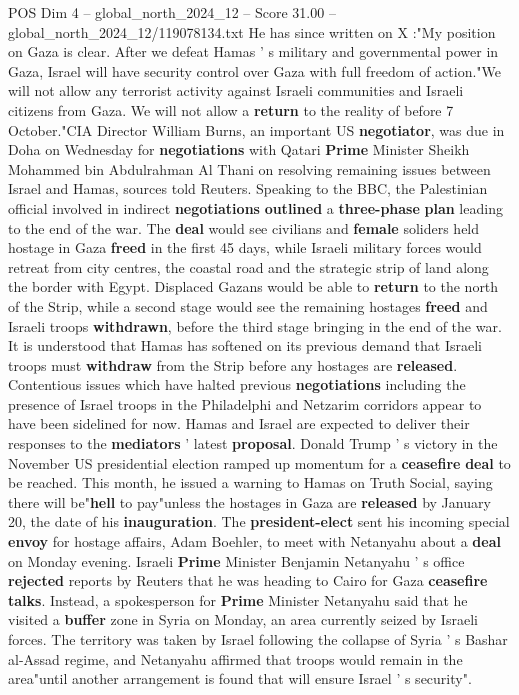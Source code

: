 \begin{textsample}{POS Dim 4 – global\_north\_2024\_12 – Score 31.00 – global\_north\_2024\_12/119078134.txt}
He has since written on X :"My position on Gaza is clear.
After we defeat Hamas ' s military and governmental power in Gaza, Israel will have security control over Gaza with full freedom of action."We will not allow any terrorist activity against Israeli communities and Israeli citizens from Gaza.
We will not allow a \textbf{return} to the reality of before 7 October."CIA Director William Burns, an important US \textbf{negotiator}, was due in Doha on Wednesday for \textbf{negotiations} with Qatari \textbf{Prime} Minister Sheikh Mohammed bin Abdulrahman Al Thani on resolving remaining issues between Israel and Hamas, sources told Reuters.
Speaking to the BBC, the Palestinian official involved in indirect \textbf{negotiations} \textbf{outlined} a \textbf{three-phase} \textbf{plan} leading to the end of the war.
The \textbf{deal} would see civilians and \textbf{female} soliders held hostage in Gaza \textbf{freed} in the first 45 days, while Israeli military forces would retreat from city centres, the coastal road and the strategic strip of land along the border with Egypt.
Displaced Gazans would be able to \textbf{return} to the north of the Strip, while a second stage would see the remaining hostages \textbf{freed} and Israeli troops \textbf{withdrawn}, before the third stage bringing in the end of the war.
It is understood that Hamas has softened on its previous demand that Israeli troops must \textbf{withdraw} from the Strip before any hostages are \textbf{released}.
Contentious issues which have halted previous \textbf{negotiations} including the presence of Israel troops in the Philadelphi and Netzarim corridors appear to have been sidelined for now.
Hamas and Israel are expected to deliver their responses to the \textbf{mediators} ' latest \textbf{proposal}.
Donald Trump ' s victory in the November US presidential election ramped up momentum for a \textbf{ceasefire} \textbf{deal} to be reached.
This month, he issued a warning to Hamas on Truth Social, saying there will be"\textbf{hell} to pay"unless the hostages in Gaza are \textbf{released} by January 20, the date of his \textbf{inauguration}.
The \textbf{president-elect} sent his incoming special \textbf{envoy} for hostage affairs, Adam Boehler, to meet with Netanyahu about a \textbf{deal} on Monday evening.
Israeli \textbf{Prime} Minister Benjamin Netanyahu ' s office \textbf{rejected} reports by Reuters that he was heading to Cairo for Gaza \textbf{ceasefire} \textbf{talks}.
Instead, a spokesperson for \textbf{Prime} Minister Netanyahu said that he visited a \textbf{buffer} zone in Syria on Monday, an area currently seized by Israeli forces.
The territory was taken by Israel following the collapse of Syria ' s Bashar al-Assad regime, and Netanyahu affirmed that troops would remain in the area"until another arrangement is found that will ensure Israel ' s security".

\end{textsample}
